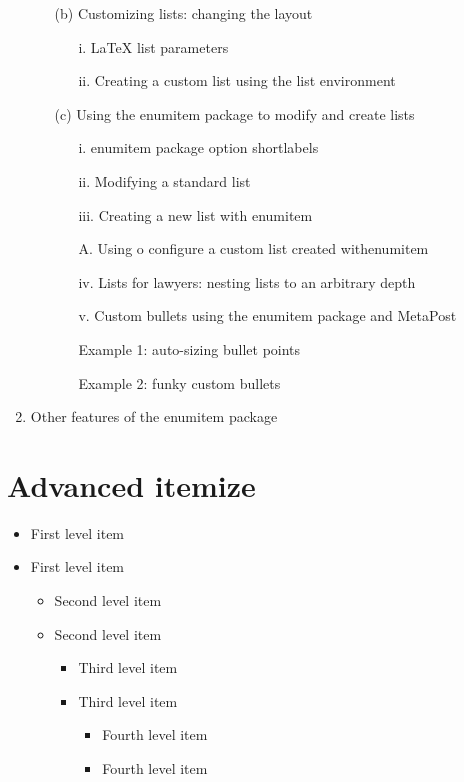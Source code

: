 \documentclass{article}
\begin{document}
\begin{enumerate}
\begin{itemize}
\begin{itemize}
\begin{itemize}
        	\end{itemize}
    	\end{itemize}
    	\item[(b)]Customizing lists: changing the layout
    	\begin{itemize}
        	\item[i.]LaTeX list parameters
        	\item[ii.]Creating a custom list using the list environment
    	\end{itemize}
    	\item[(c)]Using the enumitem package to modify and create lists
    	\begin{itemize}
        	\item[i.]enumitem package option shortlabels
        	\item[ii.]Modifying a standard list
        	\item[iii.]Creating a new list with enumitem
        	\item []A. Using o configure a custom list created withenumitem
        	\item[iv.]Lists for lawyers: nesting lists to an arbitrary depth
        	\item[v.]Custom bullets using the enumitem package and MetaPost
        	\item[Example 1:]auto-sizing bullet points
        	\item[Example 2:]funky custom bullets
    	\end{itemize}
	\end{itemize}
	\item Other features of the enumitem package
\end{enumerate}

\section{Advanced itemize}

\begin{itemize}
	\item First level item
	\item First level item
	\begin{itemize}
    	\item Second level item
    	\item Second level item
    	\begin{itemize}
        	\item Third level item
        	\item Third level item
        	\begin{itemize}
            	\item Fourth level item
            	\item Fourth level item
        	\end{itemize}
    	\end{itemize}
	\end{itemize}
\end{itemize}
\end{document}
